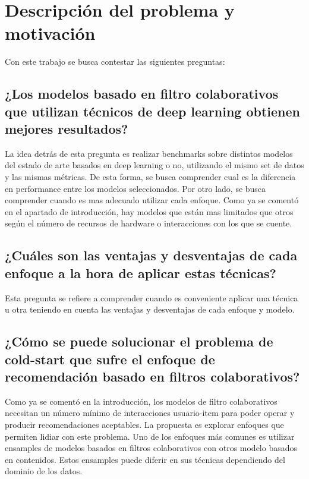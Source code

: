\documentclass[11pt,a4paper,twoside]{thesis}
\begin{document}
\section{Descripción del problema y motivación}

Con este trabajo se busca contestar las siguientes preguntas:

\subsection{¿Los modelos basado en filtro colaborativos que utilizan técnicos de deep learning obtienen mejores resultados?}

La idea detrás de esta pregunta es realizar benchmarks sobre distintos modelos del estado de arte basados en deep learning o no, utilizando el mismo set de datos y las mismas métricas. De esta forma, se busca comprender cual es la diferencia en performance entre los modelos seleccionados. Por otro lado, se busca comprender cuando es mas adecuado utilizar cada enfoque. Como ya se comentó en el apartado de introducción, hay modelos que están mas limitados que otros según el número de recursos de hardware o interacciones con los que se cuente.

\subsection{¿Cuáles son las ventajas y desventajas de cada enfoque a la hora de aplicar estas técnicas?}

Esta pregunta se refiere a comprender cuando es conveniente aplicar una técnica u otra teniendo en cuenta las ventajas y desventajas de cada enfoque y modelo.

\subsection{¿Cómo se puede solucionar el problema de cold-start que sufre el enfoque de recomendación basado en filtros colaborativos?}

Como ya se comentó en la introducción, los modelos de filtro colaborativos necesitan un número mínimo de interacciones usuario-item para poder operar y producir recomendaciones aceptables. La propuesta es explorar enfoques que permiten lidiar con este problema. Uno de los enfoques más comunes es utilizar ensamples de modelos basados en filtros colaborativos con otros modelo basados en contenidos. Estos ensamples puede diferir en sus técnicas dependiendo del dominio de los datos.
\end{document}
